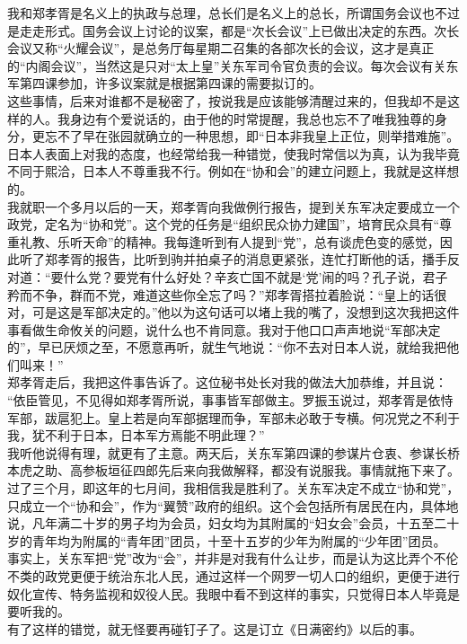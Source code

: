 我和郑孝胥是名义上的执政与总理，总长们是名义上的总长，所谓国务会议也不过是走走形式。国务会议上讨论的议案，都是“次长会议”上已做出决定的东西。次长会议又称“火耀会议”，是总务厅每星期二召集的各部次长的会议，这才是真正的“内阁会议”，当然这是只对“太上皇”关东军司令官负责的会议。每次会议有关东军第四课参加，许多议案就是根据第四课的需要拟订的。\\

这些事情，后来对谁都不是秘密了，按说我是应该能够清醒过来的，但我却不是这样的人。我身边有个爱说话的，由于他的时常提醒，我总也忘不了唯我独尊的身分，更忘不了早在张园就确立的一种思想，即“日本非我皇上正位，则举措难施”。日本人表面上对我的态度，也经常给我一种错觉，使我时常信以为真，认为我毕竟不同于熙洽，日本人不尊重我不行。例如在“协和会”的建立问题上，我就是这样想的。\\

我就职一个多月以后的一天，郑孝胥向我做例行报告，提到关东军决定要成立一个政党，定名为“协和党”。这个党的任务是“组织民众协力建国”，培育民众具有“尊重礼教、乐听天命”的精神。我每逢听到有人提到“党”，总有谈虎色变的感觉，因此听了郑孝胥的报告，比听到驹并拍桌子的消息更紧张，连忙打断他的话，播手反对道：“要什么党？要党有什么好处？辛亥亡国不就是‘党’闹的吗？孔子说，君子矜而不争，群而不党，难道这些你全忘了吗？”郑孝胥搭拉着脸说：“皇上的话很对，可是这是军部决定的。”他以为这句话可以堵上我的嘴了，没想到这次我把这件事看做生命攸关的问题，说什么也不肯同意。我对于他口口声声地说“军部决定的”，早已厌烦之至，不愿意再听，就生气地说：“你不去对日本人说，就给我把他们叫来！”\\

郑孝胥走后，我把这件事告诉了。这位秘书处长对我的做法大加恭维，并且说：\\

“依臣管见，不见得如郑孝胥所说，事事皆军部做主。罗振玉说过，郑孝胥是依恃军部，跋扈犯上。皇上若是向军部据理而争，军部未必敢于专横。何况党之不利于我，犹不利于日本，日本军方焉能不明此理？”\\

我听他说得有理，就更有了主意。两天后，关东军第四课的参谋片仓衷、参谋长桥本虎之助、高参板垣征四郎先后来向我做解释，都没有说服我。事情就拖下来了。\\

过了三个月，即这年的七月间，我相信我是胜利了。关东军决定不成立“协和党”，只成立一个“协和会”，作为“翼赞”政府的组织。这个会包括所有居民在内，具体地说，凡年满二十岁的男子均为会员，妇女均为其附属的“妇女会”会员，十五至二十岁的青年均为附属的“青年团”团员，十至十五岁的少年为附属的“少年团”团员。\\

事实上，关东军把“党”改为“会”，并非是对我有什么让步，而是认为这比弄个不伦不类的政党更便于统治东北人民，通过这样一个网罗一切人口的组织，更便于进行奴化宣传、特务监视和奴役人民。我眼中看不到这样的事实，只觉得日本人毕竟是要听我的。\\

有了这样的错觉，就无怪要再碰钉子了。这是订立《日满密约》以后的事。